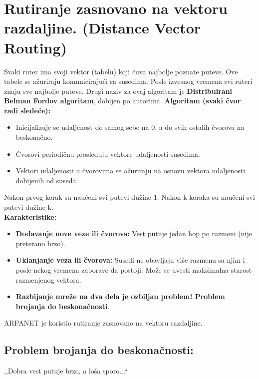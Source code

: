 \documentclass[a4paper]{article}
\begin{document}
\section{Rutiranje zasnovano na vektoru razdaljine. (Distance Vector Routing)}
    Svaki ruter ima svoji vektor (tabelu) koji čuva najbolje poznate puteve. Ove tabele se ažuriraju
    komunicirajući sa susedima. Posle izvesnog vremena svi ruteri znaju sve najbolje puteve.
    Drugi naziv za ovaj algoritam je \textbf{Distribuirani Belman Fordov algoritam}, dobijen po autorima.
    \textbf{Algoritam (svaki čvor radi sledeće):}
    \begin{itemize}
        \item Inicijalizuje se udaljenost do samog sebe na 0, a do svih ostalih čvorova
              na beskonačno.
        \item Čvorovi periodičnu prosleđuju vektore udaljenosti susedima.
        \item Vektori udaljenosti u čvorovima se ažuriraju na osnovu vektora udaljenosti dobijenih od suseda. 
    \end{itemize} 
    Nakon prvog korak su naučeni svi putevi dužine 1. Nakon k koraka su naučeni svi putevi dužine k.\\
    \noindent \textbf{Karakteristike:}
    \begin{itemize}
        \item \textbf{Dodavanje nove veze ili čvorova:} Vest putuje jedan hop po razmeni (nije
              preterano brzo).
        \item \textbf{Uklanjanje veza ili čvorova:} Susedi ne obavljaju više razmenu sa njim i posle
              nekog vremena zaborave da postoji. Može se uvesti maksimalna starost razmenjenog 
              vektora.
        \item \textbf{Razbijanje mreže na dva dela je ozbiljan problem! Problem brojanja
              do beskonačnosti}.
    \end{itemize}
    ARPANET je koristio rutiranje zasnovano na vektoru razdaljine. 

    \subsection{Problem brojanja do beskonačnosti:}
        ,,Dobra vest putuje brzo, a loša sporo...``\\
        
\end{document}

